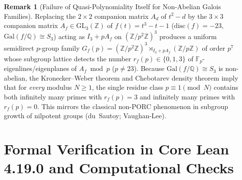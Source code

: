 \documentclass[11pt,a4paper]{article}
\theoremstyle{definition}
\newtheorem{remark}[theorem]{Remark}
\newcommand{\GL}{\mathrm{GL}}
\newcommand{\Fp}{\mathbb{F}_p}
\begin{document}
\begin{remark}[Failure of Quasi-Polynomiality Itself for Non-Abelian Galois Families]
Replacing the $2 \times 2$ companion matrix $A_d$ of $t^2 - d$ by the $3 \times 3$ companion matrix $A_f \in \GL_3(\mathbb{Z})$ of $f(t) = t^3 - t - 1$ ($\mathrm{disc}(f) = -23$, $\mathrm{Gal}(f/\mathbb{Q}) \cong S_3$) acting as $I_3 + p A_f$ on $(\mathbb{Z}/p^2\mathbb{Z})^3$ produces a uniform semidirect $p$-group family $G_f(p) = (\mathbb{Z}/p^2\mathbb{Z})^3 \rtimes_{I_3 + p A_f} (\mathbb{Z}/p\mathbb{Z})$ of order $p^7$ whose subgroup lattice detects the number $r_f(p) \in \{0, 1, 3\}$ of $\Fp$-eigenlines/eigenplanes of $A_f \bmod p$ ($p \ne 23$). Because $\mathrm{Gal}(f/\mathbb{Q}) \cong S_3$ is non-abelian, the Kronecker--Weber theorem and Chebotarev density theorem imply that for \emph{every} modulus $N \ge 1$, the single residue class $p \equiv 1 \pmod N$ contains both infinitely many primes with $r_f(p) = 3$ and infinitely many primes with $r_f(p) = 0$. This mirrors the classical non-PORC phenomenon in subgroup growth of nilpotent groups (du~Sautoy; Vaughan-Lee).
\end{remark}

\section{Formal Verification in Core Lean 4.19.0 and Computational Checks}
\end{document}
